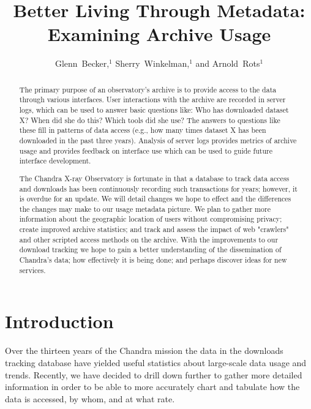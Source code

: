 
\resetcounters




\title{Better Living Through Metadata: Examining Archive Usage}
\author{Glenn~Becker,$^1$ Sherry~Winkelman,$^1$ and Arnold~Rots$^1$}


\begin{abstract}
The primary purpose of an observatory's archive is to provide access to the data through 
various interfaces. User interactions with the archive are recorded in server logs, which 
can be used to answer basic questions like: Who has downloaded dataset X? When did she 
do this? Which tools did she use? The answers to questions like these fill in patterns 
of data access (e.g., how many times dataset X has been downloaded in the past three years). 
Analysis of server logs provides metrics of archive usage and provides feedback on interface 
use which can be used to guide future interface development.

The Chandra X-ray Observatory is fortunate in that a database to track data access and 
downloads has been continuously recording such transactions for years; however, it is 
overdue for an update. We will detail changes we hope to effect and the differences 
the changes may make to our usage metadata picture. We plan to gather more information 
about the geographic location of users without compromising privacy; create improved 
archive statistics; and track and assess the impact of web "crawlers" and other scripted 
access methods on the archive. With the improvements to our download tracking we hope to 
gain a better understanding of the dissemination of Chandra's data; how effectively it 
is being done; and perhaps discover ideas for new services.
\end{abstract}

\section{Introduction}

Over the thirteen years of the Chandra mission the data in the downloads tracking database 
have yielded useful statistics about large-scale data usage and trends. Recently, we have
decided to drill down further to gather more detailed information in order to be able to 
more accurately chart and tabulate how the data is accessed, by whom, and at what rate.

